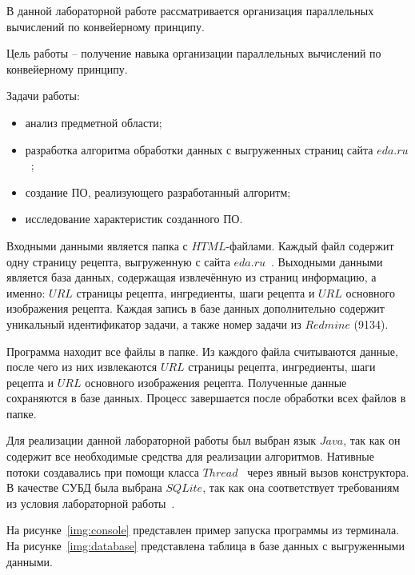 

В данной лабораторной работе рассматривается организация параллельных вычислений по конвейерному принципу.

Цель работы -- получение навыка организации параллельных вычислений по конвейерному принципу. 

Задачи работы: 
\begin{itemize}
	\item анализ предметной области;
	\item разработка алгоритма обработки данных с выгруженных страниц сайта $eda.ru$~\cite{eda};
	\item создание ПО, реализующего разработанный алгоритм;
	\item исследование характеристик созданного ПО.
\end{itemize}


Входными данными является папка с $HTML$-файлами. Каждый файл содержит одну страницу рецепта, выгруженную с сайта $eda.ru$~\cite{eda}. Выходными данными является база данных, содержащая извлечённую из страниц информацию, а именно: $URL$ страницы рецепта, ингредиенты, шаги рецепта и $URL$ основного изображения рецепта. Каждая запись в базе данных дополнительно содержит уникальный идентификатор задачи, а также номер задачи из $Redmine$ (9134).


Программа находит все файлы в папке. Из каждого файла считываются данные, после чего из них извлекаются $URL$ страницы рецепта, ингредиенты, шаги рецепта и $URL$ основного изображения рецепта. Полученные данные сохраняются в базе данных. Процесс завершается после обработки всех файлов в папке. 


Для реализации данной лабораторной работы был выбран язык $Java$, так как он содержит все необходимые средства для реализации алгоритмов. Нативные потоки создавались при помощи класса $Thread$~\cite{thread} через явный вызов конструктора. В качестве СУБД была выбрана $SQLite$, так как она соответствует требованиям из условия лабораторной работы~\cite{sqlite}.

На рисунке~\ref{img:console} представлен пример запуска программы из терминала. На рисунке~\ref{img:database} представлена таблица в базе данных с выгруженными данными. 

